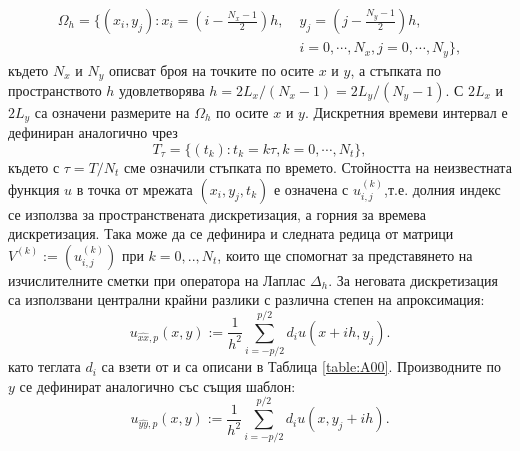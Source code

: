 \documentclass{article}
\begin{document}
\begin{align}
\Omega_h = \{(x_i,y_j): x_i = (i-\frac{N_x-1}{2})h, \; &y_j = (j-\frac{N_y-1}{2})h, \nonumber\\
                                         & i = 0,\cdots, N_x, j = 0 ,\cdots , N_y \},
\end{align}
където $N_x$ и $N_y$ описват броя на точките по осите $x$ и $y$, а стъпката по пространството $h$ удовлетворява $h =2 L_x/(N_x-1) =2 L_y/(N_y-1)$.
С $2 L_x$ и $2 L_y$ са означени размерите на $\Omega_h$ по осите $x$ и $y$. Дискретния времеви интервал е дефиниран аналогично чрез
$$
T_{\tau} = \{(t_k): t_k = k\tau, k = 0,\cdots ,N_t \},
$$
където с $\tau = T/N_t$ сме означили стъпката по времето. Стойността на неизвестната функция $u$ в точка от мрежата $(x_i,y_j,t_k)$ е означена с $u_{i,j}^{(k)}$,т.е. долния индекс се използва за пространствената дискретизация, а горния за времева дискретизация. Така може да се дефинира и следната редица от матрици $V^{(k)} := (u_{i,j}^{(k)})$ при $k=0,..,N_t$, които ще спомогнат за представянето на изчислителните сметки при оператора на Лаплас $\Delta_h$. За неговата дискретизация са използвани централни крайни разлики с различна степен на апроксимация:
\begin{equation}\label{fdx}
u_{\widehat{xx},p}(x,y) :=  \frac{1}{h^2} \sum\limits_{i=-p/2}^{p/2} d_i u(x+ih, y_j).
\end{equation}
като теглата $d_i$ са взети от \cite{forn} и са описани в Таблица \ref{table:A00}. Производните по $y$ се дефинират аналогично със същия шаблон:
\begin{equation}\label{fdy}
u_{\widehat{yy},p}(x,y) :=  \frac{1}{h^2} \sum\limits_{i=-p/2}^{p/2} d_i u(x, y_j+ih).
\end{equation}
\end{document}
